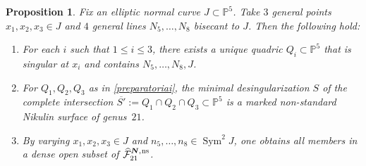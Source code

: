 \documentclass[JEP,XML,SOM,Unicode,NoEqCountersInSection,published]{cedram}
\newcommand{\ns}{{\mkern1mu\mathrm{ns}}}
\newcommand{\bN}{\boldsymbol{N}}
\theoremstyle{plain}
\newtheorem{prop}[thm]{Proposition}
\theoremstyle{definition}
\DeclareMathOperator{\Sym}{Sym}
\newcommand\PP{{\mathbb P}}
\newcommand\F{{\mathcal F}}
\begin{document}
\begin{prop}\label{preparatoria}
Fix an elliptic normal curve $J\subset\PP^5$. Take $3$ general points $x_1,x_2,x_3\in J$ and $4$ general lines $N_5,\ldots, N_8$ bisecant to $J$. Then the following hold:
\begin{enumerate}
\item\label{preparatoriai} For each $i$ such that $1\leq i\leq 3$, there exists a unique quadric $Q_i\subset\PP^5$ that is singular at $x_i$ and contains $N_5,\ldots, N_8, J$.
\item\label{preparatoriaii} For $Q_1,Q_2,Q_3$ as in \eqref{preparatoriai}, the minimal desingularization $S$ of the complete intersection $\overline{S'}:= Q_1\cap Q_2\cap Q_3\subset \PP^5$ is a marked non-standard Nikulin surface of genus~$21$.
\item\label{preparatoriaiii} By varying $x_1,x_2,x_3\in J$ and $n_5,\ldots,n_8\in \Sym^2J$, one obtains all members in a dense open subset of $\widehat{\F}_{21}^{\bN,\ns}$.
\end{enumerate}
\end{prop}
\end{document}
